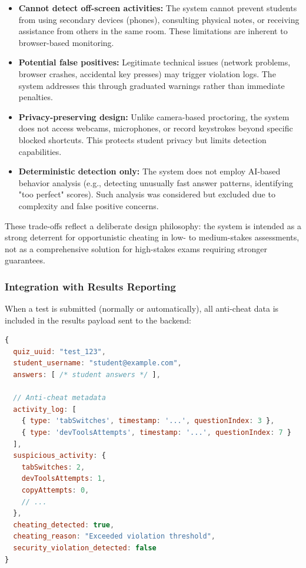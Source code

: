 \begin{itemize}
    \item \textbf{Cannot detect off-screen activities:} The system cannot prevent students from using secondary devices (phones), consulting physical notes, or receiving assistance from others in the same room. These limitations are inherent to browser-based monitoring.
    
    \item \textbf{Potential false positives:} Legitimate technical issues (network problems, browser crashes, accidental key presses) may trigger violation logs. The system addresses this through graduated warnings rather than immediate penalties.
    
    \item \textbf{Privacy-preserving design:} Unlike camera-based proctoring, the system does not access webcams, microphones, or record keystrokes beyond specific blocked shortcuts. This protects student privacy but limits detection capabilities.
    
    \item \textbf{Deterministic detection only:} The system does not employ AI-based behavior analysis (e.g., detecting unusually fast answer patterns, identifying "too perfect" scores). Such analysis was considered but excluded due to complexity and false positive concerns.
\end{itemize}

These trade-offs reflect a deliberate design philosophy: the system is intended as a strong deterrent for opportunistic cheating in low- to medium-stakes assessments, not as a comprehensive solution for high-stakes exams requiring stronger guarantees.

\subsubsection{Integration with Results Reporting}

When a test is submitted (normally or automatically), all anti-cheat data is included in the results payload sent to the backend:

\begin{lstlisting}[language=JavaScript, caption={Anti-Cheat Data in Submission Payload}]
{
  quiz_uuid: "test_123",
  student_username: "student@example.com",
  answers: [ /* student answers */ ],
  
  // Anti-cheat metadata
  activity_log: [
    { type: 'tabSwitches', timestamp: '...', questionIndex: 3 },
    { type: 'devToolsAttempts', timestamp: '...', questionIndex: 7 }
  ],
  suspicious_activity: {
    tabSwitches: 2,
    devToolsAttempts: 1,
    copyAttempts: 0,
    // ...
  },
  cheating_detected: true,
  cheating_reason: "Exceeded violation threshold",
  security_violation_detected: false
}
\end{lstlisting}

